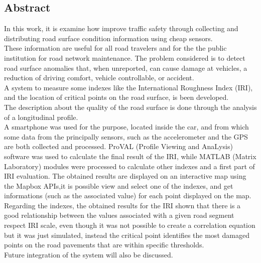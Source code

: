 \documentclass{standalone}
\begin{document}
\begin{flushright}
\section*{Abstract}\label{Abstract}

\vspace{10mm}
\end{flushright}
\noindent In this work, it is examine how improve traffic safety through collecting and distributing road surface condition information using cheap sensors.\\ These information are useful for all road travelers and for the the public institution for road network maintenance.
The problem considered is to detect road surface anomalies that, when unreported, can cause damage at vehicles, a reduction of driving comfort, vehicle controllable, or accident.\\A system to measure some indexes like the International Roughness Index (IRI), and the location of critical points on the road surface, is been developed. \\ The description about the quality of the road surface is done through the analysis of a longitudinal profile.\\A smartphone was used for the purpose, located inside the car, and from which some data from the principally sensors, such as the accelerometer and the GPS are both collected and processed. ProVAL (Profile Viewing and AnaLysis) software was used to calculate the final result of the IRI, while MATLAB (Matrix Laboratory) modules were processed to calculate other indexes and a first part of IRI evaluation. The obtained results are displayed on an interactive map using the Mapbox APIs,it is possible view and select one of the indexes, and get informations (such as the associated value) for each point displayed on the map.\\Regarding the indexes, the obtained results for the IRI shown that there is a good relationship between the values associated with a given road segment respect IRI scale, even though it was not possible to create a correlation equation but it was just simulated, instead the critical point identifies the most damaged points on the road pavements that are within specific thresholds.\\Future integration of the system will also be discussed.
\clearpage
\end{document}

